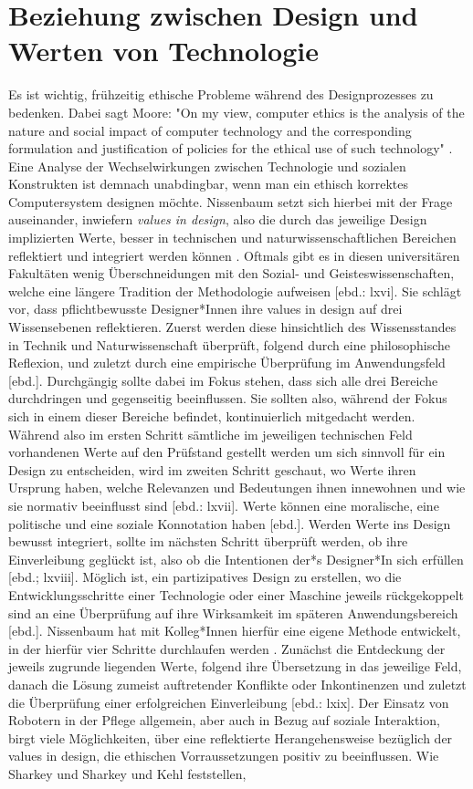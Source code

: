 \section{Beziehung zwischen Design und Werten von Technologie}
\label{sec:values}
Es ist wichtig, frühzeitig ethische Probleme während des Designprozesses zu bedenken.
Dabei sagt Moore: "On my view, computer ethics is the analysis of the nature and social impact of computer technology and the corresponding formulation and justification of policies for the ethical use of such technology" \cite[1]{comEthics}. Eine Analyse der Wechselwirkungen zwischen Technologie und sozialen Konstrukten ist demnach unabdingbar, wenn man ein ethisch korrektes Computersystem designen möchte. Nissenbaum setzt sich hierbei mit der Frage auseinander, inwiefern \textit{values in design}, also die durch das jeweilige Design implizierten Werte, besser in technischen und naturwissenschaftlichen Bereichen reflektiert und integriert werden können \cite{nissenbaum}. Oftmals gibt es in diesen universitären Fakultäten wenig Überschneidungen mit den Sozial- und Geisteswissenschaften, welche eine längere Tradition der Methodologie aufweisen [ebd.: lxvi]. Sie schlägt vor, dass pflichtbewusste Designer*Innen ihre values in design auf drei Wissensebenen reflektieren. Zuerst werden diese hinsichtlich des Wissensstandes in Technik und Naturwissenschaft überprüft, folgend durch eine philosophische Reflexion, und zuletzt durch eine empirische Überprüfung im Anwendungsfeld [ebd.]. Durchgängig sollte dabei im Fokus stehen, dass sich alle drei Bereiche durchdringen und gegenseitig beeinflussen. Sie sollten also, während der Fokus sich in einem dieser Bereiche befindet, kontinuierlich mitgedacht werden. Während also im ersten Schritt sämtliche im jeweiligen technischen Feld vorhandenen Werte auf den Prüfstand gestellt werden um sich sinnvoll für ein Design zu entscheiden, wird im zweiten Schritt geschaut, wo Werte ihren Ursprung haben, welche Relevanzen und Bedeutungen ihnen innewohnen und wie sie normativ beeinflusst sind [ebd.: lxvii]. Werte können eine moralische, eine politische und eine soziale Konnotation haben [ebd.]. Werden Werte ins Design bewusst integriert, sollte im nächsten Schritt überprüft werden, ob ihre Einverleibung geglückt ist, also ob die Intentionen der*s Designer*In sich erfüllen [ebd.; lxviii].  Möglich ist, ein partizipatives Design zu erstellen, wo die Entwicklungsschritte einer Technologie oder einer Maschine jeweils rückgekoppelt sind an eine Überprüfung auf ihre Wirksamkeit im späteren Anwendungsbereich [ebd.]. Nissenbaum hat mit Kolleg*Innen hierfür eine eigene Methode entwickelt, in der hierfür vier Schritte durchlaufen werden \cite{nissenbaum}. Zunächst die Entdeckung der jeweils zugrunde liegenden Werte, folgend ihre Übersetzung in das jeweilige Feld, danach die Lösung zumeist auftretender Konflikte oder Inkontinenzen und zuletzt die Überprüfung einer erfolgreichen Einverleibung [ebd.: lxix]. Der Einsatz von Robotern in der Pflege allgemein, aber auch in Bezug auf soziale Interaktion, birgt viele Möglichkeiten, über eine reflektierte Herangehensweise bezüglich der values in design, die ethischen Vorraussetzungen positiv zu beeinflussen. Wie Sharkey und Sharkey und Kehl feststellen, 